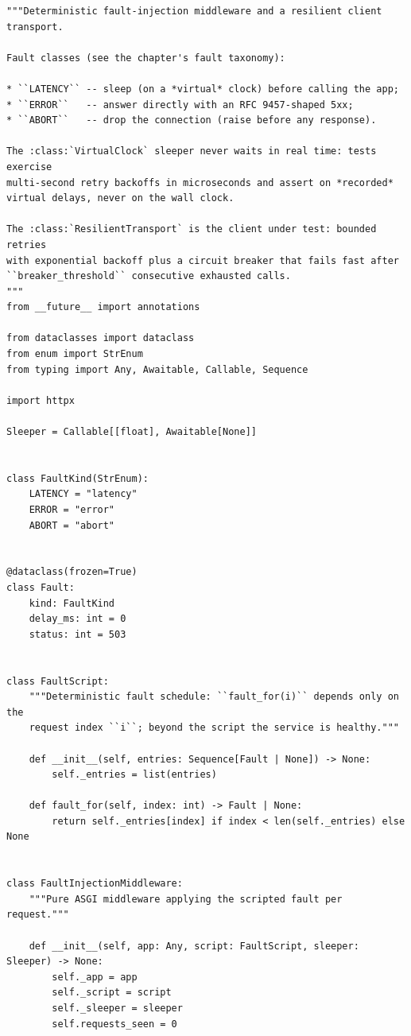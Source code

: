 \begin{verbatim}
"""Deterministic fault-injection middleware and a resilient client transport.

Fault classes (see the chapter's fault taxonomy):

* ``LATENCY`` -- sleep (on a *virtual* clock) before calling the app;
* ``ERROR``   -- answer directly with an RFC 9457-shaped 5xx;
* ``ABORT``   -- drop the connection (raise before any response).

The :class:`VirtualClock` sleeper never waits in real time: tests exercise
multi-second retry backoffs in microseconds and assert on *recorded*
virtual delays, never on the wall clock.

The :class:`ResilientTransport` is the client under test: bounded retries
with exponential backoff plus a circuit breaker that fails fast after
``breaker_threshold`` consecutive exhausted calls.
"""
from __future__ import annotations

from dataclasses import dataclass
from enum import StrEnum
from typing import Any, Awaitable, Callable, Sequence

import httpx

Sleeper = Callable[[float], Awaitable[None]]


class FaultKind(StrEnum):
    LATENCY = "latency"
    ERROR = "error"
    ABORT = "abort"


@dataclass(frozen=True)
class Fault:
    kind: FaultKind
    delay_ms: int = 0
    status: int = 503


class FaultScript:
    """Deterministic fault schedule: ``fault_for(i)`` depends only on the
    request index ``i``; beyond the script the service is healthy."""

    def __init__(self, entries: Sequence[Fault | None]) -> None:
        self._entries = list(entries)

    def fault_for(self, index: int) -> Fault | None:
        return self._entries[index] if index < len(self._entries) else None


class FaultInjectionMiddleware:
    """Pure ASGI middleware applying the scripted fault per request."""

    def __init__(self, app: Any, script: FaultScript, sleeper: Sleeper) -> None:
        self._app = app
        self._script = script
        self._sleeper = sleeper
        self.requests_seen = 0


\end{verbatim}
